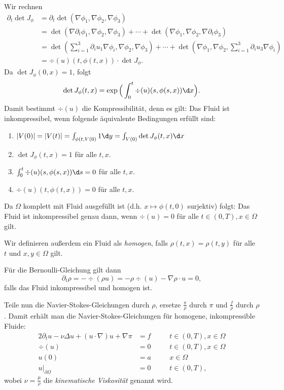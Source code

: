 Wir rechnen
\begin{align*}
  \partial_t \det J_\phi
  &= \partial_t \det (\nabla \phi_1, \nabla \phi_2, \nabla \phi_3) \\
  &= \det (\nabla \partial_t \phi_1, \nabla \phi_2, \nabla \phi_3) + \cdots  +  \det(\nabla\phi_1, \nabla\phi_2, \nabla\partial_t \phi_3) \\
  &= \det( \sum_{i = 1}^3 \partial_i u_1 \nabla \phi_i, \nabla\phi_2, \nabla \phi_3) + \cdots + \det(\nabla\phi_1, \nabla\phi_2, \sum_{i = 1}^3 \partial_i u_3  \nabla \phi_i) \\
  &= \div(u)(t,\phi(t,x)) \cdot \det J_\phi.
\end{align*}
Da $\det J_\phi(0,x) = 1$, folgt 
$$
\det J_\phi(t,x) = \exp\Big( \int_0^t \div(u)(s,\phi(s,x))\d x \Big).
$$
Damit bestimmt $\div(u)$ die Kompressibilität, denn es gilt:
Das Fluid ist inkompressibel, wenn folgende äquivalente Bedingungen erfüllt sind:
\begin{enumerate}[1)]
  \item $|V(0)| = |V(t)| = \int_{\phi(t,V(0)} 1 \d y = \int_{V(0)} \det J_\phi(t,x) \d x$
  \item $\det J_\phi(t,x) = 1$ für alle $t, x$.
  \item $\int_0^t \div(u)(s,\phi(s,x)) \d s = 0$ für alle $t,x$.
  \item $\div(u)(t,\phi(t,x)) = 0$ für alle $t,x$.
\end{enumerate}
Da $\Omega$ komplett mit Fluid ausgefüllt ist (d.h. $x \mapsto \phi(t,0)$ surjektiv) folgt: Das Fluid ist inkompressibel genau dann, wenn $\div(u) = 0$ für alle $t \in (0,T), x \in \Omega$ gilt.

Wir definieren außerdem ein Fluid als \emph{homogen}, falls $\rho(t,x) = \rho(t,y)$ für alle $t$ und $x,y \in \Omega$ gilt.

Für die Bernoulli-Gleichung gilt dann
$$
\partial_t \rho = -\div(\rho u) = -\rho \div(u) - \nabla \rho \cdot u = 0,
$$
falls das Fluid inkompressibel und homogen ist.

Teile nun die Navier-Stokes-Gleichungen durch $\rho$, ersetze $\frac{\pi}{\rho}$ durch $\pi$ und $\frac{f}{\rho}$ durch $\rho$.
Damit erhält man die Navier-Stokes-Gleichungen für homogene, inkompressible Fluide:
\begin{alignat*}{2}
  \partial_t u - \nu \Delta u + (u \cdot \nabla) u + \nabla \pi &= f \quad&&t \in (0,T), x \in \Omega \\
  \div(u) &= 0 \quad&&t \in (0,T), x \in \Omega\\
  u(0) &= a \quad&&x \in \Omega \\
  u|_{\partial\Omega} &= 0  \quad&&t \in (0,T),
\end{alignat*}
wobei $\nu = \frac{\mu}{\rho}$ die \emph{kinematische Viskosität} genannt wird.


